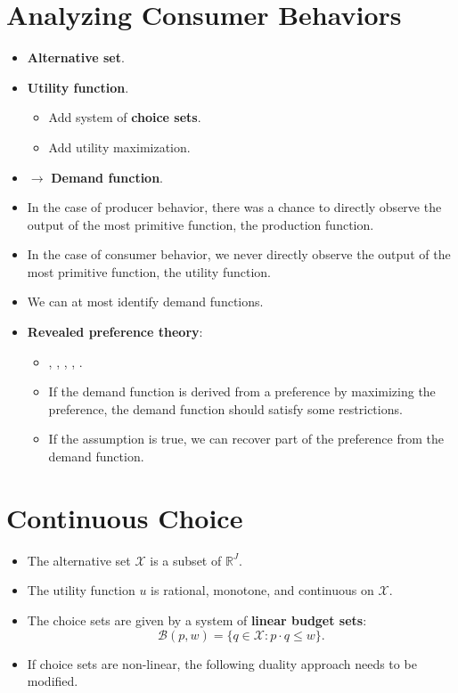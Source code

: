 \documentclass[
]{book}
\providecommand{\tightlist}{%
  \setlength{\itemsep}{0pt}\setlength{\parskip}{0pt}}
\begin{document}
\hypertarget{analyzing-consumer-behaviors}{%
\section{Analyzing Consumer Behaviors}\label{analyzing-consumer-behaviors}}

\begin{itemize}
\item
  \textbf{Alternative set}.
\item
  \textbf{Utility function}.

  \begin{itemize}
  \tightlist
  \item
    Add system of \textbf{choice sets}.
  \item
    Add utility maximization.
  \end{itemize}
\item
  \(\rightarrow\) \textbf{Demand function}.
\item
  In the case of producer behavior, there was a chance to directly observe the output of the most primitive function, the production function.
\item
  In the case of consumer behavior, we never directly observe the output of the most primitive function, the utility function.
\item
  We can at most identify demand functions.
\item
  \textbf{Revealed preference theory}:

  \begin{itemize}
  \tightlist
  \item
    \citet{Samuelson1938}, \citet{Houthakker1950}, \citet{Richter1966}, \citet{Afriat1967}, \citet{Varian1982}.
  \item
    If the demand function is derived from a preference by maximizing the preference, the demand function should satisfy some restrictions.
  \item
    If the assumption is true, we can recover part of the preference from the demand function.
  \end{itemize}
\end{itemize}

\hypertarget{continuous-choice}{%
\section{Continuous Choice}\label{continuous-choice}}

\begin{itemize}
\tightlist
\item
  The alternative set \(\mathcal{X}\) is a subset of \(\mathbb{R}^J\).
\item
  The utility function \(u\) is rational, monotone, and continuous on \(\mathcal{X}\).
\item
  The choice sets are given by a system of \textbf{linear budget sets}:
  \[
  \mathcal{B}(p, w) = \{q \in \mathcal{X}: p \cdot q \le w\}.
  \]
\item
  If choice sets are non-linear, the following duality approach needs to be modified.
\end{itemize}
\end{document}
